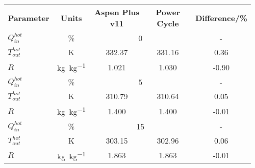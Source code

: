 \begin{tabular}{|p{2.5cm} c c c c|}
    \hline
    \rowcolor{bluepoli!40} %
    \textbf{Parameter} & \textbf{Units} & \textbf{Aspen Plus v11} & \textbf{Power Cycle} & \textbf{Difference/\unit{\percent}} \T\B \\
    \hline\hline
    \(Q_{in}^{hot}\) & \unit{\percent} & \multicolumn{2}{c}{\num{0}} & - \T\B\\
    \hline
    \(T_{out}^{hot}\) & \unit{\K} & 332.37 & 331.16 & 0.36 \T\B\\
    \(R\) & \unit{\kg\per\kg} & 1.021 & 1.030 & -0.90 \T\B\\
    \hline \hline
    \(Q_{in}^{hot}\) & \unit{\percent} & \multicolumn{2}{c}{\num{5}} & - \T\B\\
    \hline
    \(T_{out}^{hot}\) & \unit{\K} & 310.79 & 310.64 & 0.05 \T\B\\
    \(R\) & \unit{\kg\per\kg} & 1.400 & 1.400 & -0.01 \T\B\\
    \hline \hline
    \(Q_{in}^{hot}\) & \unit{\percent} & \multicolumn{2}{c}{\num{15}} & - \T\B\\
    \hline
    \(T_{out}^{hot}\) & \unit{\K} & 303.15 & 302.96 & 0.06 \T\B\\
    \(R\) & \unit{\kg\per\kg} & 1.863 & 1.863 & -0.01 \T\B\\
    \hline
\end{tabular}